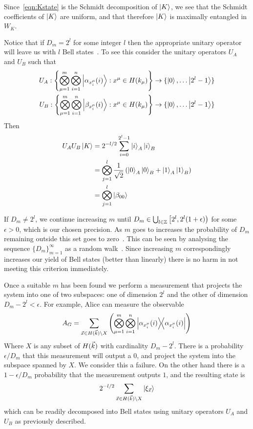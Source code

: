 Since~\eqref{eqn:Kstate} is the Schmidt decomposition of $\ket{K}$, we see that the Schmidt coefficients of $\ket{K}$ are uniform, and that therefore $\ket{K}$ is maximally entangled in $W_K$.

Notice that if $D_m = 2^l$ for some integer $l$ then the appropriate unitary operator will leave us with $l$ Bell states~\cite{bennett1996concentrating}. To see this consider the unitary operators $U_A$ and $U_B$ such that
\begin{align*}
U_A : \left\{
\bigotimes_{\mu=1}^m\bigotimes_{i=1}^n 
\ket{\alpha_{x_i^\mu}(i)}: x^\mu \in H(k_\mu) 
\right\} &\rightarrow \{\ket{0}, \ldots \ket{2^l-1
}\} \\
U_B :\left\{
\bigotimes_{\mu=1}^m\bigotimes_{i=1}^n 
\ket{\beta_{x_i^\mu}(i)}: x^\mu \in H(k_\mu) 
\right\} &\rightarrow \{\ket{0}, \ldots \ket{2^l-1
}\}
\end{align*}
Then
\begin{align*}
U_A U_B \ket{K} &= 2^{-l/2}\sum_{i=0}^{2^l-1} \ket{i}_A\ket{i}_B\\
&= \bigotimes_{j=1}^l \frac{1}{\sqrt{2}} \left(  \ket{0}_A \ket{0}_B + \ket{1}_A \ket{1}_B \right) \\
&= \bigotimes_{j=1}^l \ket{\beta_{00}}
\end{align*}

If $D_m \neq 2^l$, we continue increasing $m$ until $D_m \in \bigcup_{l \in \mathbb{Z} }\left[2^l, 2^l(1+\epsilon)\right)$ for some $\epsilon > 0$, which is our chosen precision. As $m$ goes to increases the probability of $D_m$ remaining outside this set goes to zero~\cite{bennett1996concentrating}. This can be seen by analysing the sequence $\{D_m\}_{m=1}^\infty$ as a random walk~\cite{bennett1996concentrating}.
Since increasing $m$ correspondingly increases our yield of Bell states (better than linearly) there is no harm in not meeting this criterion immediately.

Once a suitable $m$ has been found we perform a measurement that projects the system into one of two subspaces: one of dimension $2^l$ and the other of dimension $D_m-2^l<\epsilon$. For example, Alice can measure the observable
$$
A_G = \sum_{\vx \in H(\vk) \setminus X} \left(
\bigotimes_{\mu=1}^m\bigotimes_{i=1}^n 
\dyad{\alpha_{x_i^\mu}(i)}{\alpha_{x_i^\mu}(i)} \right)
$$
Where $X$ is any subset of $H({\vec{k}})$ with cardinality $D_m - 2^l$.
There is a probability $\epsilon / D_m$ that this measurement will output a $0$, and project the system into the subspace spanned by $X$. We consider this a failure. On the other hand there is a $1-\epsilon / D_m$ probability that the measurement outputs $1$, and the resulting state is
$$
2^{-l/2} \sum_{{\vec{x}} \in H({\vec{k}}) \setminus X} \ket{ \xi_{\vec{x}} }
$$
which can be readily decomposed into Bell states using unitary operators $U_A$ and $U_B$ as previously described.
